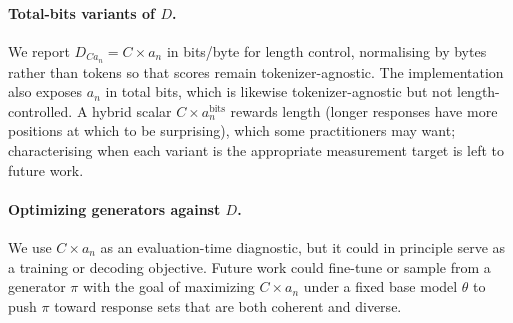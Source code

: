 \paragraph{Total-bits variants of $D$.}
We report $D_{Ca_n} = C \times a_n$ in bits/byte for length control, normalising by bytes rather than tokens so that scores remain tokenizer-agnostic.
The implementation also exposes $a_n$ in total bits, which is likewise tokenizer-agnostic but not length-controlled.
A hybrid scalar $C \times a_n^{\text{bits}}$ rewards length (longer responses have more positions at which to be surprising), which some practitioners may want; characterising when each variant is the appropriate measurement target is left to future work.

\paragraph{Optimizing generators against $D$.}
We use $C \times a_n$ as an evaluation-time diagnostic, but it could in principle serve as a training or decoding objective. Future work could fine-tune or sample from a generator $\pi$ with the goal of maximizing $C \times a_n$ under a fixed base model $\theta$ to push $\pi$ toward response sets that are both coherent and diverse.

